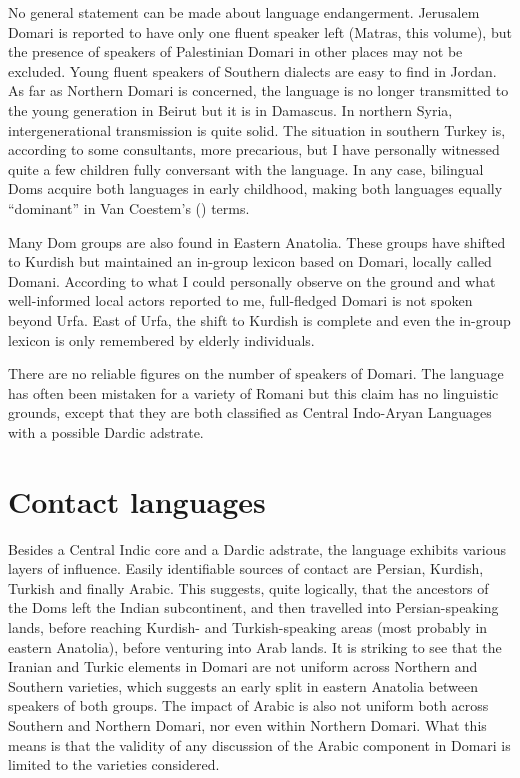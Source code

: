 \documentclass[output=paper]{langsci/langscibook}
\begin{document}
No general statement can be made about language endangerment. Jerusalem Domari is reported to have only one fluent speaker left (Matras, this volume), but the presence of speakers of Palestinian Domari in other places may not be excluded. Young fluent speakers of Southern dialects are easy to find in Jordan. As far as Northern Domari is concerned, the language is no longer transmitted to the young generation in Beirut but it is in Damascus. In northern Syria, intergenerational transmission is quite solid. The situation in southern Turkey is, according to some consultants, more precarious, but I have personally witnessed quite a few children fully conversant with the language. In any case, bilingual Doms acquire both languages in early childhood, making both languages equally “dominant” in Van Coestem’s (\citeyear{VanCoetsem1988,VanCoetsem2000}) terms.

Many Dom groups are also found in Eastern Anatolia. These groups have shifted to Kurdish but maintained an in-group lexicon based on Domari, locally called Domani. According to what I could personally observe on the ground and what well-informed local actors reported to me, full-fledged Domari is not spoken beyond Urfa. East of Urfa, the shift to Kurdish is complete and even the in-group lexicon is only remembered by elderly individuals. 

There are no reliable figures on the number of speakers of Domari. The language has often been mistaken for a variety of Romani but this claim has no linguistic grounds, except that they are both classified as Central Indo-Aryan Languages with a possible Dardic adstrate.

\section{Contact languages}

Besides a Central Indic core and a Dardic adstrate, the language exhibits various layers of influence. Easily identifiable sources of contact are Persian, Kurdish, Turkish and finally Arabic. This suggests, quite logically, that the ancestors of the Doms left the Indian subcontinent, and then travelled into Persian-speaking lands, before reaching Kurdish- and Turkish-speaking areas (most probably in eastern Anatolia), before venturing into Arab lands. It is striking to see that the Iranian and Turkic elements in Domari are not uniform across Northern and Southern varieties, which suggests an early split in eastern Anatolia between speakers of both groups. The impact of Arabic is also not uniform both across Southern and Northern Domari, nor even within Northern Domari. What this means is that the validity of any discussion of the Arabic component in Domari is limited to the varieties considered.
\end{document}
